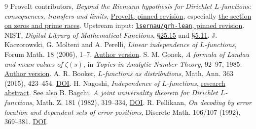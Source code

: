 \documentclass[11pt]{article}
\theoremstyle{remark}\newtheorem{remark}[theorem]{Remark}
\newcommand{\repo}{\href{https://github.com/VladimirReshetnikov/ProveIt/tree/00cadb961bbe77c74e5d082c4948f8884d58a970/Analysis/GeneralizedRiemannHypothesis}{ProveIt, pinned revision}}
\begin{document}
\begin{thebibliography}{9}
 ProveIt contributors, \emph{Beyond the Riemann hypothesis for Dirichlet $L$-functions: consequences, transfers and limits}, \repo, especially
\href{https://github.com/VladimirReshetnikov/ProveIt/blob/00cadb961bbe77c74e5d082c4948f8884d58a970/Analysis/GeneralizedRiemannHypothesis/Article/sections/zer.tex}{the section on zeros and prime races}. Upstream input: \href{https://github.com/lsernau/grh-lean/tree/72fead102f663d5c7a407964a13dc0cf9d977207}{\texttt{lsernau/grh-lean}, pinned revision}.
 NIST, \emph{Digital Library of Mathematical Functions}, \href{https://dlmf.nist.gov/25.15}{\S25.15} and \href{https://dlmf.nist.gov/5.11}{\S5.11}.
 J. Kaczorowski, G. Molteni and A. Perelli, \emph{Linear independence of $L$-functions}, Forum Math. 18 (2006), 1--7. \href{https://sites.unimi.it/molteni/research/papers-pdf/14-molteni-Linear_independence_of_L-functions.pdf}{Author version}.
 S. M. Gonek, \emph{A formula of Landau and mean values of $\zeta(s)$}, in \emph{Topics in Analytic Number Theory}, 92--97, 1985. \href{https://www.sas.rochester.edu/mth/people/faculty/gonek-steve/assets/pdf/8-landau-form.pdf}{Author version}.
 A. R. Booker, \emph{$L$-functions as distributions}, Math. Ann. 363 (2015), 423--454. \href{https://doi.org/10.1007/s00208-015-1178-z}{DOI}.
 H. Nagoshi, \emph{Independence of $L$-functions}, \href{https://www.math.kobe-u.ac.jp/prob/nagoshi_1.pdf}{research abstract}. See also B. Bagchi, \emph{A joint universality theorem for Dirichlet $L$-functions}, Math. Z. 181 (1982), 319--334, \href{https://doi.org/10.1007/BF01161980}{DOI}.
 R. Pellikaan, \emph{On decoding by error location and dependent sets of error positions}, Discrete Math. 106/107 (1992), 369--381. \href{https://doi.org/10.1016/0012-365X(92)90567-Y}{DOI}.
\end{thebibliography}
\end{document}
